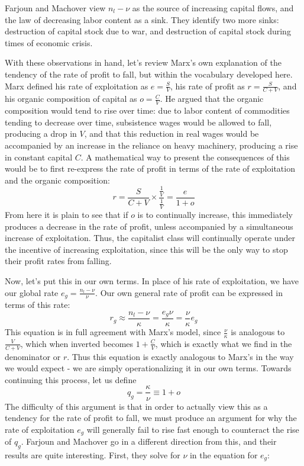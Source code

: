 \documentclass{article}
\theoremstyle{definition}
\theoremstyle{plain}
\theoremstyle{theorem}
\begin{document}
Farjoun and Machover view $n_l-\nu$ as the source of increasing capital flows, and the law of decreasing labor content as a sink. They identify two more sinks: destruction of capital stock due to war, and destruction of capital stock during times of economic crisis. \par 
With these observations in hand, let's review Marx's own explanation of the tendency of the rate of profit to fall, but within the vocabulary developed here. Marx defined his rate of exploitation as $e = \frac{S}{V}$, his rate of profit as $r = \frac{S}{C+V}$, and his organic composition of capital as $o =\frac{C}{V}$. He argued that the organic composition would tend to rise over time: due to labor content of commodities tending to decrease over time, subsistence wages would be allowed to fall, producing a drop in $V$, and that this reduction in real wages would be accompanied by an increase in the reliance on heavy machinery, producing a rise in constant capital $C$. A mathematical way to present the consequences of this would be to first re-express the rate of profit in terms of the rate of exploitation and the organic composition:
\[ r = \frac{S}{C+V}\times \frac{\frac{1}{V}}{\frac{1}{V}} = \frac{e}{1+o} \]
From here it is plain to see that if $o$ is to continually increase, this immediately produces a decrease in the rate of profit, unless accompanied by a simultaneous increase of exploitation. Thus, the capitalist class will continually operate under the incentive of increasing exploitation, since this will be the only way to stop their profit rates from falling. \par 
Now, let's put this in our own terms. In place of his rate of exploitation, we have our global rate $e_g = \frac{n_l-\nu}{\nu}$. Our own general rate of profit can be expressed in terms of this rate:
\[ r_g \approx \frac{n_l-\nu}{\kappa} = \frac{e_g\nu}{\kappa} = \frac{\nu}{\kappa}e_g \]
This equation is in full agreement with Marx's model, since $\frac{\nu}{\kappa}$ is analogous to $\frac{V}{C+V}$, which when inverted becomes $1+\frac{C}{V}$, which is exactly what we find in the denominator or $r$. Thus this equation is exactly analogous to Marx's in the way we would expect - we are simply operationalizing it in our own terms. Towards continuing this process, let us define 
\[ q_g = \frac{\kappa}{\nu} \equiv 1+o \]
The difficulty of this argument is that in order to actually view this as a tendency for the rate of profit to fall, we must produce an argument for why the rate of exploitation $e_g$ will generally fail to rise fast enough to counteract the rise of $q_g$. Farjoun and Machover go in a different direction from this, and their results are quite interesting. First, they solve for $\nu$ in the equation for $e_g$:
\end{document}
